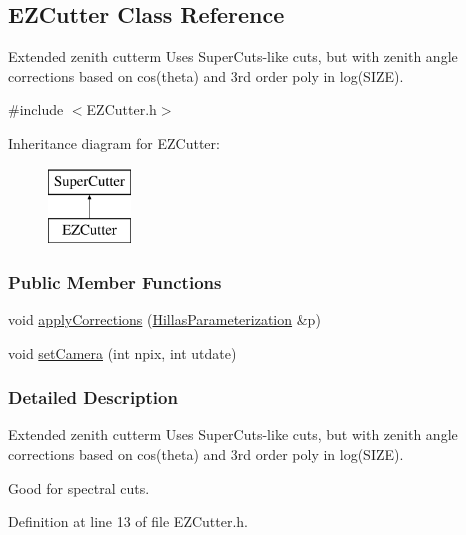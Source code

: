 \hypertarget{classEZCutter}{
\subsection{EZCutter Class Reference}
\label{classEZCutter}
}


Extended zenith cutterm Uses SuperCuts-\/like cuts, but with zenith angle corrections based on cos(theta) and 3rd order poly in log(SIZE).  




{\ttfamily \#include $<$EZCutter.h$>$}

Inheritance diagram for EZCutter:\begin{figure}[H]
\begin{center}
\leavevmode
\includegraphics[height=2.000000cm]{classEZCutter}
\end{center}
\end{figure}
\subsubsection*{Public Member Functions}
\begin{DoxyCompactItemize}
\item 
void \hyperlink{classEZCutter_adfef095f257966676350821591df66ed}{applyCorrections} (\hyperlink{structHillasParameterization}{HillasParameterization} \&p)
\item 
\hypertarget{classEZCutter_a2478de078ec3c1e0cf03c40a7cef8ff0}{
void \hyperlink{classEZCutter_a2478de078ec3c1e0cf03c40a7cef8ff0}{setCamera} (int npix, int utdate)}
\label{classEZCutter_a2478de078ec3c1e0cf03c40a7cef8ff0}

\end{DoxyCompactItemize}


\subsubsection{Detailed Description}
Extended zenith cutterm Uses SuperCuts-\/like cuts, but with zenith angle corrections based on cos(theta) and 3rd order poly in log(SIZE). 

Good for spectral cuts. 

Definition at line 13 of file EZCutter.h.



